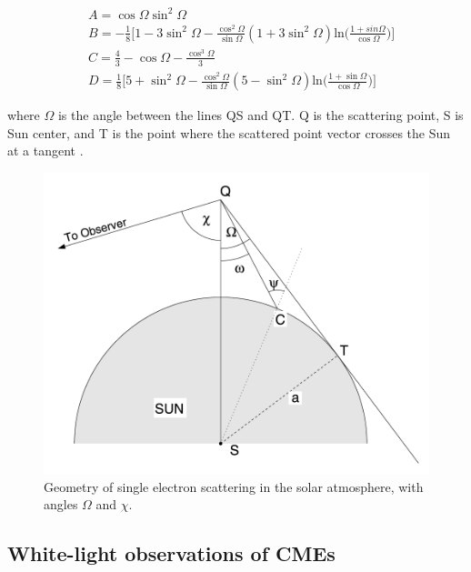 \begin{subequations}
\begin{align}
\tag{a}
& A = \cos \Omega \sin^2 \Omega \\
\tag{b}
& B = -\frac{1}{8}\bigg[1 - 3\sin^2\Omega -\frac{\cos^2\Omega}{\sin\Omega}(1+3\sin^2\Omega)\textrm{ln}\bigg(\frac{1+sin\Omega}{\cos\Omega}\bigg)\bigg] \\
\tag{c}
& C = \frac{4}{3} - \cos\Omega - \frac{\cos^3\Omega}{3} \\
\tag{d}
& D = \frac{1}{8}\bigg[5 + \sin^2\Omega -\frac{\cos^2\Omega}{\sin\Omega}(5-\sin^2\Omega)\textrm{ln}\bigg(\frac{1+\sin\Omega}{\cos\Omega}\bigg)\bigg] 
\end{align}
\end{subequations}

where $\Omega$ is the angle between the lines QS and QT. Q is the scattering point, S is Sun center, and T is the point where the scattered point vector crosses the Sun at a tangent \citep{howtap2009}.

\begin{figure}[h!]
\begin{center}
\includegraphics[scale=0.3, angle=0]{images/Omega}
\caption{Geometry of single electron scattering in the solar atmosphere, with angles $\Omega$ and $\chi$.}
\end{center}
\end{figure}


\subsection{White-light observations of CMEs}\label{sec:11}



